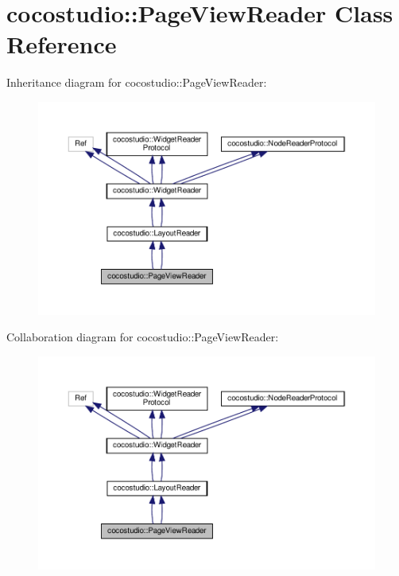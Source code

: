 \hypertarget{classcocostudio_1_1PageViewReader}{}\section{cocostudio\+:\+:Page\+View\+Reader Class Reference}
\label{classcocostudio_1_1PageViewReader}


Inheritance diagram for cocostudio\+:\+:Page\+View\+Reader\+:
\nopagebreak
\begin{figure}[H]
\begin{center}
\leavevmode
\includegraphics[width=350pt]{classcocostudio_1_1PageViewReader__inherit__graph}
\end{center}
\end{figure}


Collaboration diagram for cocostudio\+:\+:Page\+View\+Reader\+:
\nopagebreak
\begin{figure}[H]
\begin{center}
\leavevmode
\includegraphics[width=350pt]{classcocostudio_1_1PageViewReader__coll__graph}
\end{center}
\end{figure}
